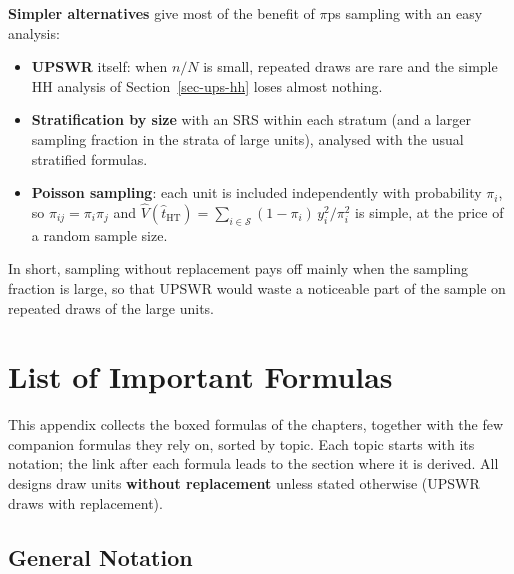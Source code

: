 \documentclass[
  letterpaper,
  DIV=11,
  numbers=noendperiod]{scrreprt}
\providecommand{\tightlist}{%
  \setlength{\itemsep}{0pt}\setlength{\parskip}{0pt}}
\renewcommand{\[}{\begin{equation}}
\renewcommand{\]}{\end{equation}}
\begin{document}
\textbf{Simpler alternatives} give most of the benefit of \(\pi\)ps
sampling with an easy analysis:

\begin{itemize}
\tightlist
\item
  \textbf{UPSWR} itself: when \(n/N\) is small, repeated draws are rare
  and the simple HH analysis of Section~\ref{sec-ups-hh} loses almost
  nothing.
\item
  \textbf{Stratification by size} with an SRS within each stratum (and a
  larger sampling fraction in the strata of large units), analysed with
  the usual stratified formulas.
\item
  \textbf{Poisson sampling}: each unit is included independently with
  probability \(\pi_i\), so \(\pi_{ij}=\pi_i\pi_j\) and
  \(\hat V(\hat t_{\mathrm{HT}})=\sum_{i\in\mathcal S}(1-\pi_i)\,y_i^2/\pi_i^2\)
  is simple, at the price of a random sample size.
\end{itemize}

In short, sampling without replacement pays off mainly when the sampling
fraction is large, so that UPSWR would waste a noticeable part of the
sample on repeated draws of the large units.

\cleardoublepage
{}
{}
\appendix

\chapter{List of Important Formulas}\label{sec-formulas}

This appendix collects the boxed formulas of the chapters, together with
the few companion formulas they rely on, sorted by topic. Each topic
starts with its notation; the link after each formula leads to the
section where it is derived. All designs draw units \textbf{without
replacement} unless stated otherwise (UPSWR draws with replacement).

\section{General Notation}\label{general-notation}
\end{document}
